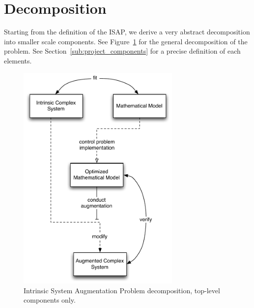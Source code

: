 
\section{Decomposition} %
\label{sec:decomposition}

Starting from the definition of the ISAP, we derive a very abstract decomposition into smaller scale components. See Figure~\ref{fig:general_decomposition} for the general decomposition of the problem. See Section~\ref{sub:project_components} for a precise definition of each elements.

\begin{figure}[ht!]
	\centering
		\includegraphics[width=8cm]{img/general_decomposition.pdf}
	\caption{Intrinsic System Augmentation Problem decomposition, top-level components only.}
	\label{fig:general_decomposition}
\end{figure}

